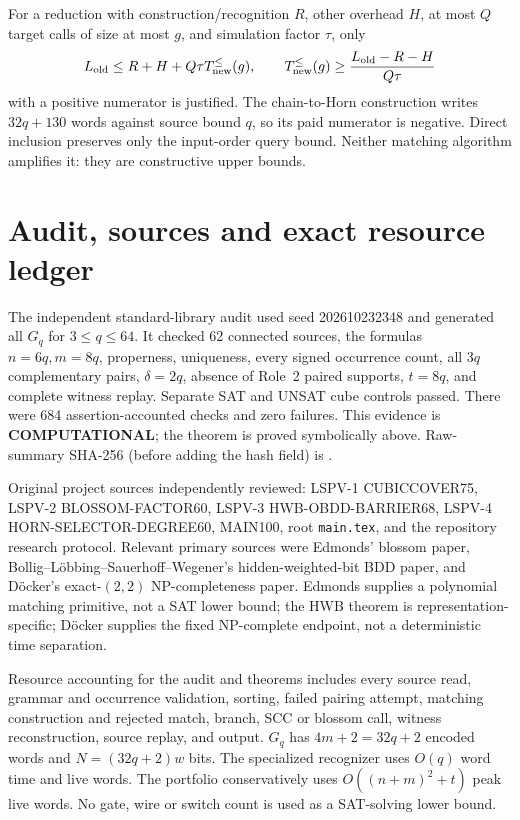 \documentclass[11pt]{article}
\begin{document}
For a reduction with construction/recognition $R$, other overhead $H$, at
most $Q$ target calls of size at most $g$, and simulation factor $\tau$, only
\[
L_{\rm old}\le R+H+Q\tau T_{\rm new}^{\le}(g),\qquad
T_{\rm new}^{\le}(g)\ge
\frac{L_{\rm old}-R-H}{Q\tau}
\]
with a positive numerator is justified.  The chain-to-Horn construction
writes $32q+130$ words against source bound $q$, so its paid numerator is
negative.  Direct inclusion preserves only the input-order query bound.
Neither matching algorithm amplifies it: they are constructive upper bounds.

\section{Audit, sources and exact resource ledger}
The independent standard-library audit used seed 202610232348 and generated
all $G_q$ for $3\le q\le64$.  It checked 62 connected sources, the formulas
$n=6q,m=8q$, properness, uniqueness, every signed occurrence count, all
$3q$ complementary pairs, $\delta=2q$, absence of Role~2 paired supports,
$t=8q$, and complete witness replay.  Separate SAT and UNSAT cube controls
passed.  There were 684 assertion-accounted checks and zero failures.
This evidence is \textbf{COMPUTATIONAL}; the theorem is proved symbolically
above.  Raw-summary SHA-256 (before adding the hash field) is
.

Original project sources independently reviewed: LSPV-1 CUBICCOVER75,
LSPV-2 BLOSSOM-FACTOR60, LSPV-3 HWB-OBDD-BARRIER68, LSPV-4
HORN-SELECTOR-DEGREE60, MAIN100, root \texttt{main.tex}, and the repository
research protocol.  Relevant primary sources were Edmonds' blossom paper,
Bollig--L\"obbing--Sauerhoff--Wegener's hidden-weighted-bit BDD paper, and
D\"ocker's exact-$(2,2)$ NP-completeness paper.  Edmonds supplies a
polynomial matching primitive, not a SAT lower bound; the HWB theorem is
representation-specific; D\"ocker supplies the fixed NP-complete endpoint,
not a deterministic time separation.

Resource accounting for the audit and theorems includes every source read,
grammar and occurrence validation, sorting, failed pairing attempt,
matching construction and rejected match, branch, SCC or blossom call,
witness reconstruction, source replay, and output.  $G_q$ has $4m+2=32q+2$
encoded words and $N=(32q+2)w$ bits.  The specialized recognizer uses
$O(q)$ word time and live words.  The portfolio conservatively uses
$O((n+m)^2+t)$ peak live words.  No gate, wire or switch count is used as a
SAT-solving lower bound.
\end{document}
